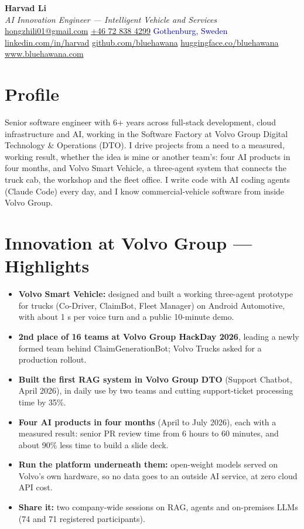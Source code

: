\documentclass[a4paper,10pt]{article}
\begin{document}
\pagestyle{empty}

\begin{center}
{\LARGE \textbf{Harvad Li}}\\[8pt]
{\Large \textit{AI Innovation Engineer --- Intelligent Vehicle and Services}}\\[8pt]
\textcolor{darkblue}{
  \href{mailto:hongzhili01@gmail.com}{hongzhili01@gmail.com} \textbar{}
  \href{tel:+46728384299}{+46 72 838 4299} \textbar{}
  Gothenburg, Sweden
}\\[3pt]
\textcolor{darkblue}{
  \href{https://www.linkedin.com/in/harvad/}{linkedin.com/in/harvad} \textbar{}
  \href{https://github.com/bluehawana}{github.com/bluehawana} \textbar{}
  \href{https://huggingface.co/bluehawana}{huggingface.co/bluehawana} \textbar{}
  \href{https://www.bluehawana.com}{www.bluehawana.com}
}
\end{center}

\section*{Profile}
Senior software engineer with 6+ years across full-stack development, cloud infrastructure and AI, working in the Software Factory at Volvo Group Digital Technology \& Operations (DTO). I drive projects from a need to a measured, working result, whether the idea is mine or another team's: four AI products in four months, and Volvo Smart Vehicle, a three-agent system that connects the truck cab, the workshop and the fleet office. I write code with AI coding agents (Claude Code) every day, and I know commercial-vehicle software from inside Volvo Group.

\section*{Innovation at Volvo Group --- Highlights}
\begin{itemize}
  \item \textbf{Volvo Smart Vehicle:} designed and built a working three-agent prototype for trucks (Co-Driver, ClaimBot, Fleet Manager) on Android Automotive, with about 1 s per voice turn and a public 10-minute demo.
  \item \textbf{2nd place of 16 teams at Volvo Group HackDay 2026}, leading a newly formed team behind ClaimGenerationBot; Volvo Trucks asked for a production rollout.
  \item \textbf{Built the first RAG system in Volvo Group DTO} (Support Chatbot, April 2026), in daily use by two teams and cutting support-ticket processing time by 35\%.
  \item \textbf{Four AI products in four months} (April to July 2026), each with a measured result: senior PR review time from 6 hours to 60 minutes, and about 90\% less time to build a slide deck.
  \item \textbf{Run the platform underneath them:} open-weight models served on Volvo's own hardware, so no data goes to an outside AI service, at zero cloud API cost.
  \item \textbf{Share it:} two company-wide sessions on RAG, agents and on-premises LLMs (74 and 71 registered participants).
\end{itemize}
\end{document}

